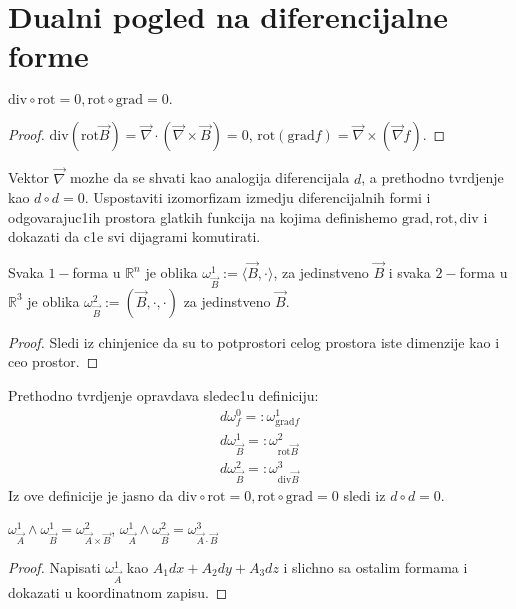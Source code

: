 \documentclass[a4paper,12pt]{article}
\newcommand{\RR}{\mathbb{R}}
\newcommand{\grad}{\mathrm{grad}}
\newcommand{\rot}{\mathrm{rot}}
\renewcommand{\div}{\mathrm{div}}
\renewcommand{\vec}{\overrightarrow}
\begin{document}
\section{Dualni pogled na diferencijalne forme}

\begin{tvr}
	\( \div \circ \rot = 0, \rot \circ \grad = 0 .\)
\end{tvr}
\begin{proof}
	$\div (\rot \vec B) = \vec \nabla \cdot (\vec \nabla \times \vec B) = 0$, $\rot (\grad f) = \vec \nabla \times (\vec \nabla  f)$.
\end{proof}

\begin{nap}
	Vektor $\vec \nabla$ mozhe da se s\-hvati kao analogija diferencijala $d$, a prethodno tvrdjenje kao $d\circ d = 0$.
	Uspostaviti izomorfizam izmedju diferencijalnih formi i odgovarajuc1ih prostora glatkih funkcija na kojima definishemo
	$\grad, \rot, \div$ i dokazati da c1e svi dijagrami komutirati.
\end{nap}

\begin{tvr}
	Svaka $1-$forma u $\RR^n$ je oblika $\omega^1_{\vec B} := \langle \vec B, \cdot \rangle$, za jedinstveno $\vec B$ i 
	svaka $2-$forma u $\RR^3$ je oblika $\omega^2_{\vec B} := (\vec B, \cdot, \cdot) $ za jedinstveno $\vec B$.
\end{tvr}
\begin{proof}
	Sledi iz chinjenice da su to potprostori celog prostora iste dimenzije kao i ceo prostor.
\end{proof}

\begin{nap}
	Prethodno tvrdjenje opravdava sledec1u definiciju:
	\begin{align*}
		d\omega^0_f =:\omega^1_{\grad f} \\
		d\omega^1_{\vec B} =:\omega^2_{\rot \vec B} \\
		d\omega^2_{\vec B} =:\omega^3_{\div \vec B}
	\end{align*}
	Iz ove definicije je jasno da \( \div \circ \rot = 0, \rot \circ \grad = 0 \) sledi iz $d \circ d = 0$.
\end{nap}

\begin{pr}
	\( \omega^1_{\vec A}\wedge \omega^1_{\vec B} = \omega^2_{\vec A \times \vec B}\),
	\( \omega^1_{\vec A}\wedge \omega^2_{\vec B} = \omega^3_{\vec A \cdot \vec B}\) 
\end{pr}
\begin{proof}
	Napisati $ \omega^1_{\vec A}$ kao $A_1dx + A_2dy + A_3dz$ i slichno sa ostalim formama i dokazati u 
	koordinatnom zapisu.
\end{proof}
\end{document}
